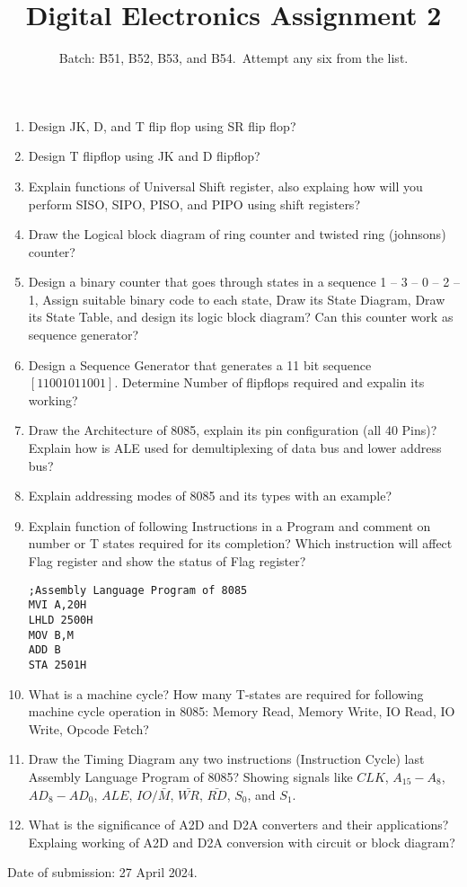 \documentclass[a4paper,12pt,two column]{article}
\author{Batch: B51, B52, B53, and B54.\ \hfill Attempt any six from the list.}
\title{Digital Electronics Assignment 2}
\begin{document}
\maketitle
\begin{enumerate}
\item Design JK, D, and T flip flop using SR flip flop?
\item Design T flipflop using JK and D flipflop?
\item Explain functions of Universal Shift register, also explaing how will you perform SISO, SIPO, PISO, and PIPO using shift registers? 
 \item Draw the Logical block diagram of ring counter and twisted ring (johnsons) counter?
\item Design a binary counter that goes through states in a sequence 1 -- 3 -- 0 -- 2 -- 1, Assign suitable binary code to each state, Draw its State Diagram, Draw its State Table, and design its logic block diagram? Can this counter work as sequence generator?
\item Design a Sequence Generator that generates a 11 bit sequence $[11001011001]$. Determine Number of flipflops required and expalin its working?


\item Draw the Architecture of 8085, explain its pin configuration (all 40 Pins)? Explain how is ALE used for demultiplexing of data bus and lower address bus? 

\item Explain addressing modes of 8085 and its types with an example?
\item Explain function of following Instructions in a Program and comment on number or T states required for its completion? Which instruction will affect Flag register and show the status of Flag register?
\begin{verbatim}
;Assembly Language Program of 8085
MVI A,20H
LHLD 2500H
MOV B,M
ADD B
STA 2501H
\end{verbatim}
\item What is a machine cycle? How many T-states are required for following machine cycle operation in 8085: Memory Read, Memory Write, IO Read, IO Write, Opcode Fetch? 
\item Draw the Timing Diagram any two instructions (Instruction Cycle) last Assembly Language Program of 8085? Showing signals like $CLK$, $A_{15}-A_{8}$, $AD_8-AD_0$, $ALE$, $IO/\bar{M}$, $\bar{WR}$, $\bar{RD}$, $S_0$, and $S_1$. 

\item What is the significance of A2D and D2A converters and their applications? Explaing working of A2D and D2A conversion with circuit or block diagram?  
\end{enumerate}
\vspace{3em}

\hfill Date of submission: 27 April 2024.
\end{document}
